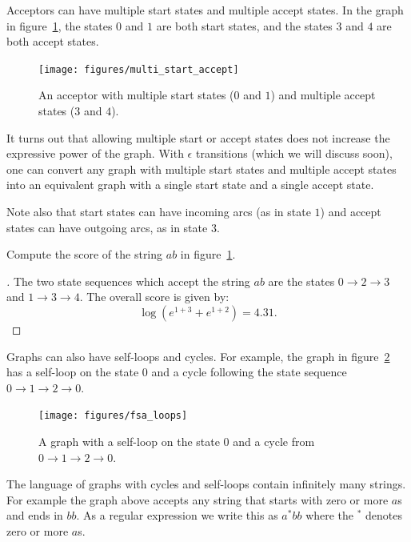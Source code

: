 Acceptors can have multiple start states and multiple accept states. In the
graph in figure~\ref{fig:multi_start_accept}, the states $0$ and $1$ are both
start states, and the states $3$ and $4$ are both accept states.

\begin{figure}
    \centering
    \texttt{[image: figures/multi\_start\_accept]}
    \caption{An acceptor with multiple start states ($0$ and $1$) and multiple
    accept states ($3$ and $4$).}
    \label{fig:multi_start_accept}
\end{figure}

It turns out that allowing multiple start or accept states does not increase
the expressive power of the graph. With $\epsilon$ transitions (which we will
discuss soon), one can convert any graph with multiple start states and
multiple accept states into an equivalent graph with a single start state and a
single accept state.

Note also that start states can have incoming arcs (as in state $1$) and accept
states can have outgoing arcs, as in state $3$.

\begin{example}
Compute the score of the string $ab$ in figure~\ref{fig:multi_start_accept}.
\end{example}

\begin{proof}[\unskip\nopunct]
The two state sequences which accept the string $ab$ are the states $0
\rightarrow 2 \rightarrow 3$ and $1 \rightarrow 3 \rightarrow 4$. The overall
score is given by:
$$
\log (e^{1 + 3} + e^{1 + 2}) = 4.31.
$$
\end{proof}

Graphs can also have self-loops and cycles. For example, the graph in
figure~\ref{fig:fsa_loops} has a self-loop on the state $0$ and a cycle
following the state sequence $0 \rightarrow 1 \rightarrow 2 \rightarrow 0$.

\begin{figure}
    \centering
    \texttt{[image: figures/fsa\_loops]}
    \caption{A graph with a self-loop on the state $0$ and a cycle from $0
    \rightarrow 1 \rightarrow 2 \rightarrow 0$.}
    \label{fig:fsa_loops}
\end{figure}

The language of graphs with cycles and self-loops contain infinitely many
strings. For example the graph above accepts any string that starts with zero
or more $a$s and ends in $bb$. As a regular expression we write this as $a^*bb$
where the $^*$ denotes zero or more $a$s.

